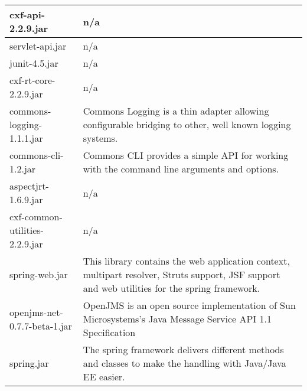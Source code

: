 \begin{center}
\begin{longtable}{|p{}|p{}|}
\hline 
cxf-api-2.2.9.jar & n/a\\
\hline 
servlet-api.jar & n/a\\
\hline 
junit-4.5.jar & n/a\\
\hline 
cxf-rt-core-2.2.9.jar & n/a\\
\hline 
commons-logging-1.1.1.jar & Commons Logging is a thin adapter allowing configurable bridging to other, well known logging systems.\\
\hline 
commons-cli-1.2.jar & Commons CLI provides a simple API for working with the command line arguments and options.\\
\hline 
aspectjrt-1.6.9.jar & n/a\\
\hline 
cxf-common-utilities-2.2.9.jar & n/a\\
\hline 
spring-web.jar & This library contains the web application context, multipart resolver, Struts support, JSF support and web utilities for the spring framework.\\
\hline 
openjms-net-0.7.7-beta-1.jar & OpenJMS is an open source implementation of Sun Microsystems's Java Message Service API 1.1 Specification\\
\hline 
spring.jar & The spring framework delivers different methods and classes to make the handling with Java/Java EE easier.\\
\hline 
\end{longtable}
\label{tabular:libraries}
\end{center}
